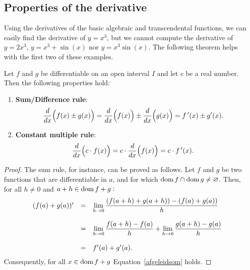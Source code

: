 \subsection{Properties of the derivative}
Using the derivatives of the basic algebraic and transcendental functions, we can easily find the derivative of $y=x^3$, but we cannot compute the derivative of $y=2x^3$, $y=x^3+\sin (x)$ nor $y=x^3\sin (x)$. The following theorem helps with the first two of these examples.

\begin{theorem}\label{thm:deriv_prop}
Let $f$ and $g$ be differentiable on an open interval $I$ and let $c$ be a real number. Then the following properties hold:
	\begin{enumerate}
	\item	\textbf{Sum/Difference rule}:
	\begin{equation}
	\displaystyle \frac{d}{dx}\Big(f(x) \pm g(x)\Big) = \frac{d}{dx}\Big(f(x)\Big) \pm \frac{d}{dx}\Big(g(x)\Big)=f\,'(x)\pm g'(x).
	\label{afgeleidsom}
	\end{equation}
	\item		\textbf{Constant multiple rule}:
	\begin{equation}
	\displaystyle \frac{d}{dx}\Big(c\cdot f(x)\Big) = c\cdot\frac{d}{dx}\Big(f(x)\Big) = c\cdot f\,'(x).
		\label{afgeleidcte}
	\end{equation}
	\end{enumerate}
\end{theorem}

\ifcourse
\ifanalysis

\begin{proof}
The sum rule, for instance, can be proved as follows. Let $f$ and $g$ be two functions that are differentiable in $a$, and  for which $\text{dom}{\,}f \cap \text{dom}{\,}g \neq \varnothing$. Then, for all  $h \neq 0$ and $a+h \in \text{dom}{\,} f+g:$
$$ \begin{array}{lcl}
(f(a)+g(a))' &= &\displaystyle\lim_{h\rightarrow 0}\dfrac{(f(a+h)+g(a+h))-(f(a)+g(a))}{h} \\
             &  & \\
             &= &\displaystyle\lim_{h\rightarrow 0}\dfrac{f(a+h)-f(a)}{h}+\displaystyle\lim_{h\rightarrow 0}
                 \dfrac{g(a+h)-g(a)}{h} \\
             &  &  \\
             &= &f'(a)+g'(a).
\end{array}$$
Consequently, for all $x \in \text{dom}{\,} f+g$ Equation~\eqref{afgeleidsom} holds. 
\end{proof}

